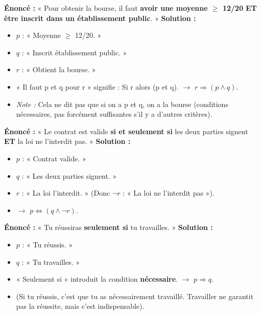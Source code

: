\documentclass[11pt]{article}
\begin{document}
\begin{exoresolu}
\textbf{Énoncé :} « Pour obtenir la bourse, il faut \textbf{avoir une moyenne $\ge$ 12/20} \textbf{ET} \textbf{être inscrit dans un établissement public}. »
\tcblower
\textbf{Solution :}
\begin{itemize}
    \item $p$ : « Moyenne $\ge$ 12/20. »
    \item $q$ : « Inscrit établissement public. »
    \item $r$ : « Obtient la bourse. »
    \item « Il faut p et q pour r » signifie : Si r alors (p et q). $\rightarrow$ \textbf{$r \Rightarrow (p \land q)$}.
    \item \emph{Note :} Cela ne dit pas que si on a p et q, on a la bourse (conditions nécessaires, pas forcément suffisantes s'il y a d'autres critères).
\end{itemize}
\end{exoresolu}

\begin{exoresolu}
\textbf{Énoncé :} « Le contrat est valide \textbf{si et seulement si} les deux parties signent \textbf{ET} la loi ne l'interdit pas. »
\tcblower
\textbf{Solution :}
\begin{itemize}
    \item $p$ : « Contrat valide. »
    \item $q$ : « Les deux parties signent. »
    \item $r$ : « La loi l'interdit. » (Donc $\neg r$ : « La loi ne l'interdit pas »).
    \item $\rightarrow$ \textbf{$p \Leftrightarrow (q \land \neg r)$}.
\end{itemize}
\end{exoresolu}

\begin{exoresolu}
\textbf{Énoncé :} « Tu réussiras \textbf{seulement si} tu travailles. »
\tcblower
\textbf{Solution :}
\begin{itemize}
    \item $p$ : « Tu réussis. »
    \item $q$ : « Tu travailles. »
    \item « Seulement si » introduit la condition \textbf{nécessaire}. $\rightarrow$ \textbf{$p \Rightarrow q$}.
    \item (Si tu réussis, c'est que tu as nécessairement travaillé. Travailler ne garantit pas la réussite, mais c'est indispensable).
\end{itemize}
\end{exoresolu}
\end{document}
